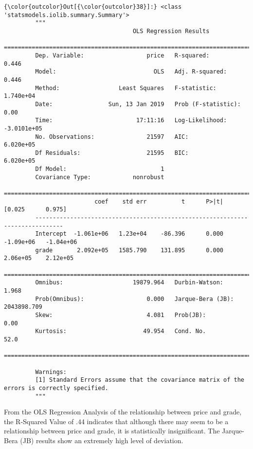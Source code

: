 \documentclass[11pt]{article}
\begin{document}
\begin{Verbatim}[commandchars=\\\{\}]
{\color{outcolor}Out[{\color{outcolor}38}]:} <class 'statsmodels.iolib.summary.Summary'>
         """
                                     OLS Regression Results                            
         ==============================================================================
         Dep. Variable:                  price   R-squared:                       0.446
         Model:                            OLS   Adj. R-squared:                  0.446
         Method:                 Least Squares   F-statistic:                 1.740e+04
         Date:                Sun, 13 Jan 2019   Prob (F-statistic):               0.00
         Time:                        17:11:16   Log-Likelihood:            -3.0101e+05
         No. Observations:               21597   AIC:                         6.020e+05
         Df Residuals:                   21595   BIC:                         6.020e+05
         Df Model:                           1                                         
         Covariance Type:            nonrobust                                         
         ==============================================================================
                          coef    std err          t      P>|t|      [0.025      0.975]
         ------------------------------------------------------------------------------
         Intercept  -1.061e+06   1.23e+04    -86.396      0.000   -1.09e+06   -1.04e+06
         grade       2.092e+05   1585.790    131.895      0.000    2.06e+05    2.12e+05
         ==============================================================================
         Omnibus:                    19879.964   Durbin-Watson:                   1.968
         Prob(Omnibus):                  0.000   Jarque-Bera (JB):          2043898.709
         Skew:                           4.081   Prob(JB):                         0.00
         Kurtosis:                      49.954   Cond. No.                         52.0
         ==============================================================================
         
         Warnings:
         [1] Standard Errors assume that the covariance matrix of the errors is correctly specified.
         """
\end{Verbatim}
            
    From the OLS Regression Analysis of the relationship between price and
grade, the R-Squared Value of .44 indicates that although there may seem
to be a relationship between price and grade, it is statistically
insignificant. The Jarque-Bera (JB) results show an extremely high level
of deviation.
\end{document}
